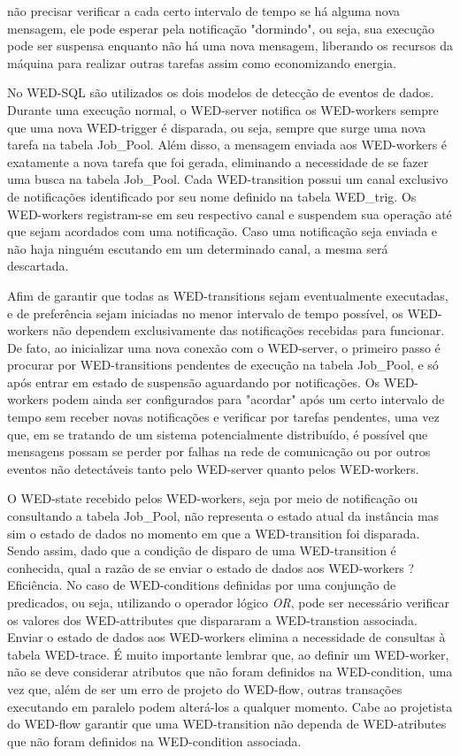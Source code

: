 \documentclass[conference]{IEEEtran}
\begin{document}
não precisar verificar a cada certo intervalo de tempo se há alguma nova mensagem, ele pode esperar pela notificação "dormindo", ou seja, sua execução
pode ser suspensa enquanto não há uma nova mensagem, liberando os recursos da máquina para realizar outras tarefas assim como economizando energia.
\par No WED-SQL são utilizados os dois modelos de detecção de eventos de dados. Durante uma execução normal, o WED-server notifica os WED-workers
sempre que uma nova WED-trigger é disparada, ou seja, sempre que surge uma nova tarefa na tabela Job\_Pool. Além disso, a mensagem enviada aos WED-workers
é exatamente a nova tarefa que foi gerada, eliminando a necessidade de se fazer uma busca na tabela Job\_Pool. Cada WED-transition possui um canal exclusivo
de notificações identificado por seu nome definido na tabela WED\_trig. Os WED-workers registram-se em seu respectivo canal e suspendem sua operação até
que sejam acordados com uma notificação. Caso uma notificação seja enviada e não haja ninguém escutando em um determinado canal, a mesma será descartada.
\par Afim de garantir que todas as WED-transitions sejam eventualmente executadas, e de preferência sejam iniciadas no menor intervalo de tempo possível, os
WED-workers não dependem exclusivamente das notificações recebidas para funcionar. De fato, ao inicializar uma nova conexão com o WED-server, o primeiro
passo é procurar por WED-transitions pendentes de execução na tabela Job\_Pool, e só após entrar em estado de suspensão aguardando por notificações. Os 
WED-workers podem ainda ser configurados para "acordar" após um certo intervalo de tempo sem receber novas notificações e verificar por tarefas pendentes,
uma vez que, em se tratando de um sistema potencialmente distribuído, é possível que mensagens possam se perder por falhas na rede de comunicação ou por
outros eventos não detectáveis tanto pelo WED-server quanto pelos WED-workers. 
\par O WED-state recebido pelos WED-workers, seja por meio de notificação ou consultando a tabela Job\_Pool, não representa o estado atual da instância mas
sim o estado de dados no momento em que a WED-transition foi disparada. Sendo assim, dado que a condição de disparo de uma WED-transition é conhecida,
qual a razão de se enviar o estado de dados aos WED-workers ? Eficiência. No caso de WED-conditions definidas por uma conjunção de predicados, ou seja, 
utilizando o operador lógico \emph{OR}, pode ser necessário verificar os valores dos WED-attributes que dispararam a WED-transtion associada. Enviar o estado
de dados aos WED-workers elimina a necessidade de consultas à tabela WED-trace. É muito importante lembrar que, ao definir um WED-worker, não se deve 
considerar atributos que não foram definidos na WED-condition, uma vez que, além de ser um erro de projeto do WED-flow, outras transações executando
em paralelo podem alterá-los a qualquer momento. Cabe ao projetista do WED-flow garantir que uma WED-transition não dependa de WED-atributes que não
foram definidos na WED-condition associada. 
\end{document}
